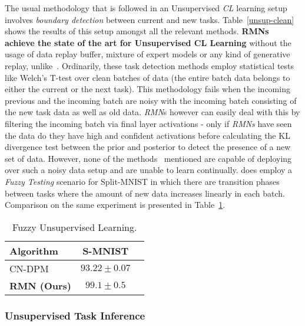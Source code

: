 \documentclass{article}
\begin{document}
The usual methodology that is followed in an Unsupervised \textit{CL} learning setup involves \textit{boundary detection} between current and new tasks. Table~\ref{unsup-clean} shows the results of this setup amongst all the relevant methods. \textbf{RMNs achieve the state of the art for Unsupervised CL Learning} without the usage of data replay buffer, mixture of expert models or any kind of generative replay, unlike~\cite{titsias2019functional, pan2021continual, lee_continual_2020}.
Ordinarily, these task detection methods employ statistical tests like Welch's T-test over clean batches of data (the entire batch data belongs to either the current or the next task). This methodology fails when the incoming previous and the incoming batch are noisy with the incoming batch consisting of the new task data as well as old data. \textit{RMN}s however can easily deal with this by filtering the incoming batch via final layer activations - only if \textit{RMNs} have seen the data do they have high and confident activations before calculating the KL divergence test between the prior and posterior to detect the presence of a new set of data. However, none of the methods~\cite{titsias2019functional, lee_continual_2020} mentioned are capable of deploying over such a noisy data setup and are unable to learn continually. \cite{lee_continual_2020} does employ a \textit{Fuzzy Testing} scenario for Split-MNIST in which there are transition phases between tasks where the amount of new data increases linearly in each batch. Comparison on the same experiment is presented in Table~\ref{noisycrsplit}.

\begin{table}
\caption{Fuzzy Unsupervised Learning.}
\label{noisycrsplit}
\begin{center}
\begin{small}
\begin{sc}
\begin{tabular}{lcc}
\toprule
Algorithm &  S-MNIST \\
\midrule
CN-DPM\tnote{$\mathbb{C},\mathcal{R}$} & $93.22 \pm 0.07$ \\
\textbf{RMN (Ours)} & $99.1 \pm 0.5$ \\
\bottomrule
\end{tabular}
\end{sc}
\end{small}
\end{center}
\vskip -0.27in
\end{table}

\subsubsection{Unsupervised Task Inference} 
\end{document}
